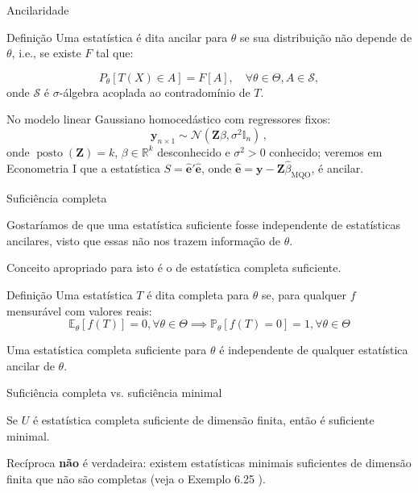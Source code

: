 \documentclass[11pt]{beamer}
\newenvironment{halfwideitemize}{\itemize\addtolength{\itemsep}{0.5em}}{\enditemize}
\begin{document}
	\begin{frame}{Ancilaridade}
		\begin{block}{Definição}
			Uma estatística é dita ancilar para $\theta$ se sua distribuição não depende de $\theta$, i.e., se existe $F$ tal que:
			
			$$P_\theta[T(X) \in A] = F[A], \quad \forall \theta \in \Theta,  A \in \mathcal{S}, $$
			onde $\mathcal{S}$ é $\sigma$-álgebra acoplada ao contradomínio de $T$.
		\end{block}
		\begin{example}
			No modelo linear Gaussiano homocedástico com regressores fixos:
			$$\boldsymbol{y}_{n\times 1} \sim \mathcal{N}(\boldsymbol{Z} \beta, \sigma^2 \mathbb{I}_n) \, ,$$
			onde $\operatorname{posto}(\boldsymbol{Z}) = k$, $\beta \in \mathbb{R}^k$ desconhecido e $\sigma^2 > 0$ conhecido; veremos em Econometria I que a estatística $S = \hat{\boldsymbol{e}}' \hat{\boldsymbol{e}}$, onde $\hat{\boldsymbol{e}} = \boldsymbol{y} - \boldsymbol{Z} \hat{\beta}_{\text{MQO}}$, é ancilar.
		\end{example}
	\end{frame}
	\begin{frame}{Suficiência completa}
		\begin{halfwideitemize}
			\item Gostaríamos de que uma estatística suficiente fosse independente de estatísticas ancilares, visto que essas não nos trazem informação de $\theta$.
			\item Conceito apropriado para isto é o de estatística {\color{blue}completa suficiente}.
			\begin{block}{Definição}
				Uma estatística $T$ é dita completa para $\theta$ se, para qualquer $f$ mensurável com valores reais:
				$$\mathbb{E}_\theta[f(T)] = 0, \forall \theta \in \Theta \implies \mathbb{P}_\theta[f(T) = 0 ] = 1, \forall \theta \in \Theta$$
			\end{block}
			
			\begin{theorem}[Basu]
				Uma estatística {\color{blue}completa suficiente} para  $\theta$ é independente de qualquer estatística ancilar de $\theta$.
			\end{theorem}
			
		\end{halfwideitemize}
		
	\end{frame}
	
	\begin{frame}{Suficiência completa vs. suficiência minimal}
		\begin{theorem}[Bahadur]
			Se $U$ é estatística completa suficiente de dimensão finita, então é suficiente minimal.
		\end{theorem}
		\begin{halfwideitemize}
			\item Recíproca {\color{red}\textbf{não}} é verdadeira: existem estatísticas minimais suficientes de dimensão finita que não são completas (veja o Exemplo 6.25 \cite{lehmann2006theory}).
		\end{halfwideitemize}
		
	\end{frame}
	
\end{document}
